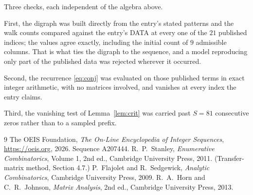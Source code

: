 \documentclass[11pt,a4paper]{article}
\theoremstyle{plain}
\theoremstyle{definition}
\begin{document}
Three checks, each independent of the algebra above.

First, the digraph was built directly from the entry's stated patterns and the walk counts
compared against the entry's DATA at every one of the $21$ published indices; the
values agree exactly, including the initial count of $9$ admissible columns. That is
what ties the digraph to the sequence, and a model reproducing only part of the published
data was rejected wherever it occurred.

Second, the recurrence \eqref{eq:conj} was evaluated on those published terms in exact
integer arithmetic, with no matrices involved, and vanishes at every index the entry claims.

Third, the vanishing test of Lemma~\ref{lem:crit} was carried past $S=81$ consecutive
zeros rather than to a sampled prefix.

\begin{thebibliography}{9}
 The OEIS Foundation, \emph{The On-Line Encyclopedia of Integer
Sequences}, \url{https://oeis.org}, 2026. Sequence A207444.
 R.~P.~Stanley, \emph{Enumerative Combinatorics}, Volume 1, 2nd ed.,
Cambridge University Press, 2011. (Transfer-matrix method, Section 4.7.)
 P.~Flajolet and R.~Sedgewick, \emph{Analytic Combinatorics}, Cambridge
University Press, 2009.
 R.~A.~Horn and C.~R.~Johnson, \emph{Matrix Analysis}, 2nd ed., Cambridge
University Press, 2013.
\end{thebibliography}
\end{document}
